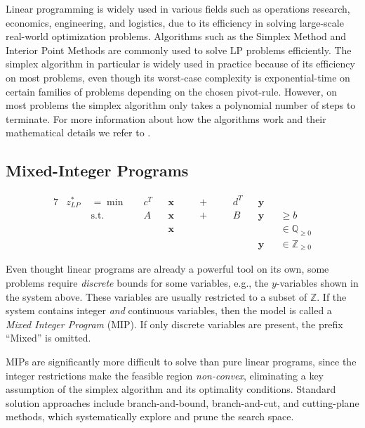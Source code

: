 		Linear programming is widely used in various fields such as operations research, economics, engineering, and logistics, due to its efficiency in solving large-scale real-world optimization problems. Algorithms such as the Simplex Method and Interior Point Methods are commonly used to solve LP problems efficiently.
		The simplex algorithm in particular is widely used in practice because of its efficiency on most problems, even though its worst-case complexity is exponential-time on certain families of problems depending on the chosen pivot-rule. 
		However, on most problems the simplex algorithm only takes a polynomial number of steps to terminate.
		For more information about how the algorithms work and their mathematical details we refer to \cite{BranchPrice}.

		\clearpage

		\subsection{Mixed-Integer Programs}
			\begin{alignat*}{7}
				&z^*_{LP} \; &={}	\min	&\quad  c^T && \mathbf{x} && \quad+\quad && d^T && \mathbf{y} \\
				&& \text{s.t.} & \quad A && \mathbf{x} && \quad+\quad  && B && \mathbf{y} && \geq b \\
				&&&&& \mathbf{x} &&&&&& &&\in \mathbb{Q}_{\geq 0} \\
				&&&&&&&&&&& \mathbf{y} &&\in \mathbb{Z}_{\geq 0}
			\end{alignat*}

			Even thought linear programs are already a powerful tool on its own, some problems require \textit{discrete} bounds for some variables, e.g., the $y$-variables shown in the system above. These variables are usually restricted to a subset of $\mathbb{Z}$.
			If the system contains integer \textit{and} continuous variables, then the model is called a \textit{Mixed Integer Program} (MIP).
			If only discrete variables are present, the prefix \enquote{Mixed} is omitted.

			MIPs are significantly more difficult to solve than pure linear programs, since the integer restrictions make the feasible region \textit{non-convex}, eliminating a key assumption of the simplex algorithm and its optimality conditions. Standard solution approaches include branch-and-bound, branch-and-cut, and cutting-plane methods, which systematically explore and prune the search space.

